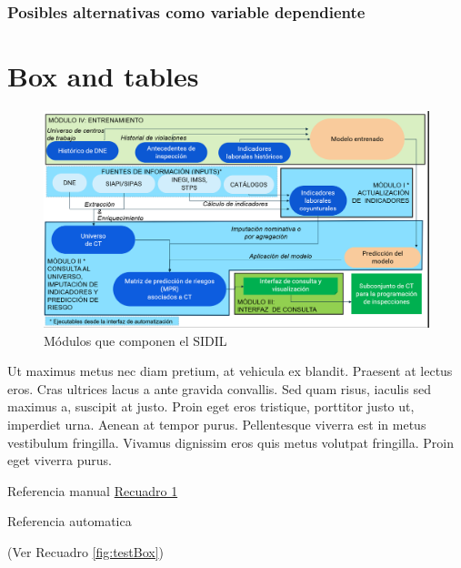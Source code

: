 \documentclass[
]{article}
\begin{document}
\hypertarget{posibles-alternativas-como-variable-dependiente}{%
\subsubsection{Posibles alternativas como variable dependiente}\label{posibles-alternativas-como-variable-dependiente}}

\hypertarget{section}{%
\subsubsection{}\label{section}}

\hypertarget{box-and-tables}{%
\section{Box and tables}\label{box-and-tables}}

\begin{figure}
\includegraphics[width=17.74in]{images-1/02/pipeline_elaborado} \caption{Módulos que componen el SIDIL}\label{fig:modulosSIDasdaIL}
\end{figure}

Ut maximus metus nec diam pretium, at vehicula ex blandit. Praesent at lectus eros. Cras ultrices lacus a ante gravida convallis. Sed quam risus, iaculis sed maximus a, suscipit at justo. Proin eget eros tristique, porttitor justo ut, imperdiet urna. Aenean at tempor purus. Pellentesque viverra est in metus vestibulum fringilla. Vivamus dignissim eros quis metus volutpat fringilla. Proin eget viverra purus.

Referencia manual
\protect\hyperlink{fig:testBox}{Recuadro 1}

Referencia automatica

(Ver Recuadro \ref{fig:testBox})
\end{document}
